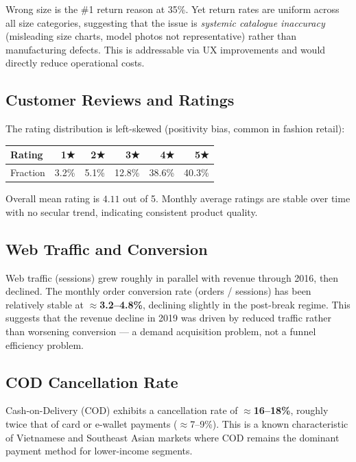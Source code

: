 \documentclass{article}
\begin{document}
\begin{warningbox}
Wrong size is the \#1 return reason at 35\%.
Yet return rates are uniform across all size categories, suggesting that the
issue is \emph{systemic catalogue inaccuracy} (misleading size charts, model
photos not representative) rather than manufacturing defects.
This is addressable via UX improvements and would directly reduce operational
costs.
\end{warningbox}

\subsection{Customer Reviews and Ratings}

The rating distribution is left-skewed (positivity bias, common in fashion
retail):

\begin{center}
\small
\begin{tabular}{lrrrrr}
\toprule
Rating & 1★ & 2★ & 3★ & 4★ & 5★ \\
\midrule
Fraction & 3.2\% & 5.1\% & 12.8\% & 38.6\% & 40.3\% \\
\bottomrule
\end{tabular}
\end{center}

Overall mean rating is $4.11$ out of 5.
Monthly average ratings are stable over time with no secular trend, indicating
consistent product quality.

\subsection{Web Traffic and Conversion}

Web traffic (sessions) grew roughly in parallel with revenue through 2016,
then declined.
The monthly order conversion rate (orders / sessions) has been relatively stable
at $\approx$\textbf{3.2--4.8\%}, declining slightly in the post-break regime.
This suggests that the revenue decline in 2019 was driven by reduced traffic
rather than worsening conversion — a demand acquisition problem, not a
funnel efficiency problem.

\subsection{COD Cancellation Rate}
\label{subsec:cod}

Cash-on-Delivery (COD) exhibits a cancellation rate of \textbf{$\approx$16--18\%},
roughly twice that of card or e-wallet payments ($\approx$7--9\%).
This is a known characteristic of Vietnamese and Southeast Asian markets where
COD remains the dominant payment method for lower-income segments.
\end{document}

